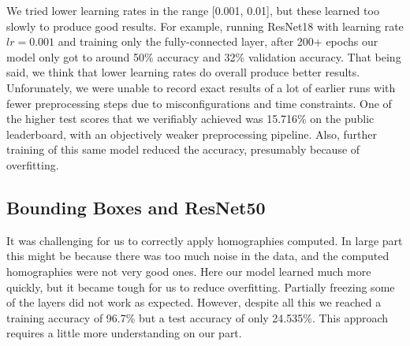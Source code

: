 We tried lower learning rates in the range [0.001, 0.01], but these learned too slowly to produce good results. For example, running ResNet18 with learning rate $lr = 0.001$ and training only the fully-connected layer, after 200+ epochs our model only got to around 50\% accuracy and 32\% validation accuracy. That being said, we think that lower learning rates do overall produce better results. Unforunately, we were unable to record exact results of a lot of earlier runs with fewer preprocessing steps due to misconfigurations and time constraints. One of the higher test scores that we verifiably achieved was 15.716\% on the public leaderboard, with an objectively weaker preprocessing pipeline. Also, further training of this same model reduced the accuracy, presumably because of overfitting.

\subsection{Bounding Boxes and ResNet50}

It was challenging for us to correctly apply homographies computed. In large part this might be because there was too much noise in the data, and the computed homographies were not very good ones. Here our model learned much more quickly, but it became tough for us to reduce overfitting. Partially freezing some of the layers did not work as expected. However, despite all this we reached a training accuracy of 96.7\% but a test accuracy of only 24.535\%. This approach requires a little more understanding on our part. 

